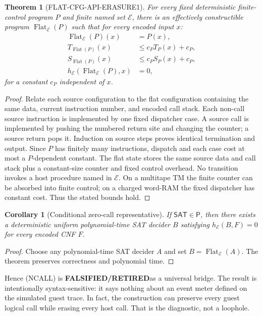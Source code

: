 \documentclass[11pt]{article}
\newcommand{\Retired}{\textbf{FALSIFIED/RETIRED}}
\newtheorem{theorem}{Theorem}
\newtheorem{corollary}{Corollary}
\begin{document}
\begin{theorem}[FLAT-CFG-API-ERASURE1]
For every fixed deterministic finite-control program $P$ and finite named set
$\mathcal E$, there is an effectively constructible program
$\operatorname{Flat}_{\mathcal E}(P)$ such that for every encoded input $x$:
\begin{align*}
 \operatorname{Flat}_{\mathcal E}(P)(x)&=P(x),\\
 T_{\operatorname{Flat}(P)}(x)&\le c_P T_P(x)+c_P,\\
 S_{\operatorname{Flat}(P)}(x)&\le c_P S_P(x)+c_P,\\
 h_{\mathcal E}(\operatorname{Flat}_{\mathcal E}(P),x)&=0,
\end{align*}
for a constant $c_P$ independent of $x$.
\end{theorem}

\begin{proof}
Relate each source configuration to the flat configuration containing the same
data, current instruction number, and encoded call stack.  Each non-call source
instruction is implemented by one fixed dispatcher case.  A source call is
implemented by pushing the numbered return site and changing the counter; a
source return pops it.  Induction on source steps proves identical termination
and output.  Since $P$ has finitely many instructions, dispatch and each case
cost at most a $P$-dependent constant.  The flat state stores the same source
data and call stack plus a constant-size counter and fixed control overhead.
No transition invokes a host procedure named in $\mathcal E$.  On a multitape
TM the finite counter can be absorbed into finite control; on a charged word-RAM
the fixed dispatcher has constant cost.  Thus the stated bounds hold.
\end{proof}

\begin{corollary}[Conditional zero-call representative]
If $\mathsf{SAT}\in\mathsf P$, then there exists a deterministic uniform
polynomial-time SAT decider $B$ satisfying
$h_{\mathcal E}(B,F)=0$ for every encoded CNF $F$.
\end{corollary}
\begin{proof}
Choose any polynomial-time SAT decider $A$ and set
$B=\operatorname{Flat}_{\mathcal E}(A)$.  The theorem preserves correctness and
polynomial time.
\end{proof}

Hence (NCALL) is \Retired as a universal bridge.  The result is intentionally
syntax-sensitive: it says nothing about an event meter defined on the simulated
guest trace.  In fact, the construction can preserve every guest logical call
while erasing every host call.  That is the diagnostic, not a loophole.
\end{document}
